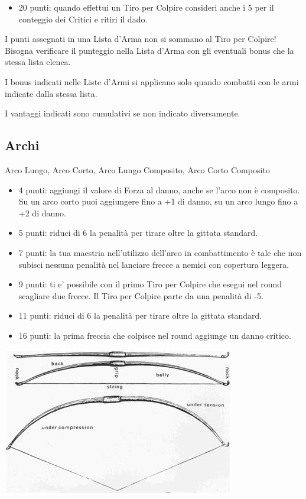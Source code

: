 \begin{multicols}{2}
\begin{itemize}[leftmargin=*]
\item 20 punti: quando effettui un Tiro per Colpire consideri anche i 5 per il conteggio dei Critici e ritiri il dado.

\end{itemize}

I punti assegnati in una Lista d'Arma non si sommano al Tiro per Colpire! Bisogna verificare il punteggio nella Lista d'Arma con gli eventuali bonus che la stessa lista elenca.

I bonus indicati nelle Liste d'Armi si applicano solo quando combatti con le armi indicate dalla stessa lista.

I vantaggi indicati sono cumulativi se non indicato diversamente.

\subsection{Archi}  Arco Lungo, Arco Corto, Arco Lungo Composito, Arco Corto Composito\label{listaarmiarchi}

\begin{itemize}[leftmargin=*] \setlength{\itemsep}{0pt}

\item 4 punti: aggiungi il valore di Forza al danno, anche se l'arco non è composito. Su un arco corto puoi aggiungere fino a +1 di danno, su un arco lungo fino a +2 di danno.
\item 5 punti: riduci di 6 la penalità per tirare oltre la gittata standard.
\item 7 punti: la tua maestria nell'utilizzo dell'arco in combattimento è tale che non subisci nessuna penalità nel lanciare frecce a nemici con copertura leggera.
\item 9 punti: ti e' possibile con il primo Tiro per Colpire che esegui nel round scagliare due frecce. Il Tiro per Colpire parte da una penalità di -5.
\item 11 punti: riduci di 6 la penalità per tirare oltre la gittata standard.
\item 16 punti: la prima freccia che colpisce nel round aggiunge un danno critico.

\end{itemize}

\begin{center}
\includegraphics[width=0.7\linewidth]{immagini/arma-arco.png}
\end{center}


\end{multicols}
